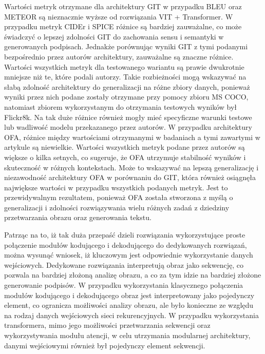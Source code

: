 \noindent Wartości metryk otrzymane dla architektury GIT w przypadku BLEU oraz METEOR są nieznacznie wyższe od rozwiązania VIT + Transformer. W przypadku metryk CIDEr i SPICE różnice są bardziej zauważalne, co może świadczyć o lepszej zdolności GIT do zachowania sensu i semantyki w generowanych podpisach. Jednakże porównując wyniki GIT z tymi podanymi bezpośrednio przez autorów architektury, zauważalne są znaczne różnice. Wartości wszystkich metryk dla testowanego wariantu są prawie dwukrotnie mniejsze niż te, które podali autorzy. Takie rozbieżności mogą wskazywać na słabą zdolność architektury do generalizacji na różne zbiory danych, ponieważ wyniki przez nich podane zostały otrzymane przy pomocy zbioru MS COCO, natomiast zbiorem wykorzystanym do otrzymania testowych wyników był Flickr8k. Na tak duże różnice również mogły mieć specyficzne warunki testowe lub wadliwość modelu przekazanego przez autorów. W przypadku architektury OFA, różnice między wartościami otrzymanymi w badaniach a tymi zawartymi w artykule są niewielkie. Wartości wszystkich metryk podane przez autorów są większe o kilka setnych, co sugeruje, że OFA utrzymuje stabilność wyników i skuteczność w różnych kontekstach. Może to wskazywać na lepszą generalizację i niezawodność architektury OFA w porównaniu do GIT, która również osiągnęła największe wartości w przypadku wszystkich podanych metryk. Jest to przewidywalnym rezultatem, ponieważ OFA została stworzona z myślą o generalizacji i zdolności rozwiązywania wielu różnych zadań z dziedziny przetwarzania obrazu oraz generowania tekstu.

Patrząc na to, iż tak duża przepaść dzieli rozwiązania wykorzystujące proste połączenie modułów kodującego i dekodującego do dedykowanych rozwiązań, można wysunąć wniosek, iż kluczowym jest odpowiednie wykorzystanie danych wejściowych. Dedykowane rozwiązania interpretują obraz jako sekwencję, co pozwala na bardziej złożoną analizę obrazu, a co za tym idzie na bardziej złożone generowanie podpisów. W przypadku wykorzystania klasycznego połączenia modułów kodującego i dekodującego obraz jest interpretowany jako pojedynczy element, co ogranicza możliwości analizy obrazu, ale było konieczne ze względu na rodzaj danych wejściowych sieci rekurencyjnych. W przypadku wykorzystania transformera, mimo jego możliwości przetwarzania sekwencji oraz wykorzystywania modułu atencji, w celu utrzymania modularnej architektury, danymi wejściowymi również był pojedynczy element sekwencji.
